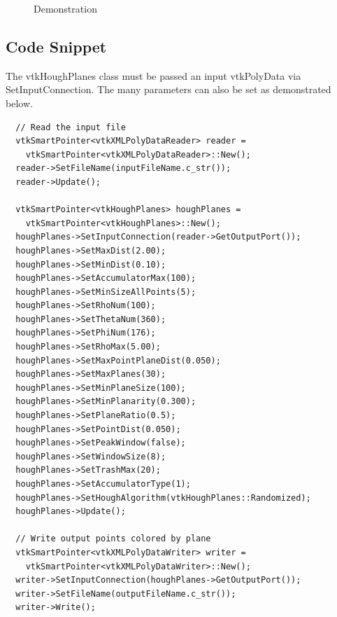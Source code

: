 \documentclass{InsightArticle}
\begin{document}
\begin{figure}[H]
\centering
{}
\caption{Demonstration}
\label{fig:Demonstration}
\end{figure}

\subsection{Code Snippet}
The vtkHoughPlanes class must be passed an input vtkPolyData via SetInputConnection. The many parameters can also be set as demonstrated below.
\begin{verbatim}
  // Read the input file
  vtkSmartPointer<vtkXMLPolyDataReader> reader =
    vtkSmartPointer<vtkXMLPolyDataReader>::New();
  reader->SetFileName(inputFileName.c_str());
  reader->Update();
  
  vtkSmartPointer<vtkHoughPlanes> houghPlanes =
    vtkSmartPointer<vtkHoughPlanes>::New();
  houghPlanes->SetInputConnection(reader->GetOutputPort());
  houghPlanes->SetMaxDist(2.00);
  houghPlanes->SetMinDist(0.10);
  houghPlanes->SetAccumulatorMax(100);
  houghPlanes->SetMinSizeAllPoints(5);
  houghPlanes->SetRhoNum(100);
  houghPlanes->SetThetaNum(360);
  houghPlanes->SetPhiNum(176);
  houghPlanes->SetRhoMax(5.00);
  houghPlanes->SetMaxPointPlaneDist(0.050);
  houghPlanes->SetMaxPlanes(30);
  houghPlanes->SetMinPlaneSize(100);
  houghPlanes->SetMinPlanarity(0.300);
  houghPlanes->SetPlaneRatio(0.5);
  houghPlanes->SetPointDist(0.050);
  houghPlanes->SetPeakWindow(false);
  houghPlanes->SetWindowSize(8);
  houghPlanes->SetTrashMax(20);
  houghPlanes->SetAccumulatorType(1);
  houghPlanes->SetHoughAlgorithm(vtkHoughPlanes::Randomized);
  houghPlanes->Update();

  // Write output points colored by plane
  vtkSmartPointer<vtkXMLPolyDataWriter> writer = 
    vtkSmartPointer<vtkXMLPolyDataWriter>::New();
  writer->SetInputConnection(houghPlanes->GetOutputPort());
  writer->SetFileName(outputFileName.c_str());
  writer->Write();

\end{verbatim}
\end{document}
